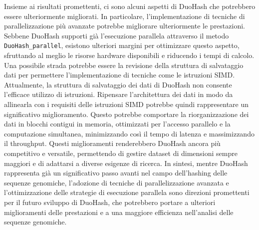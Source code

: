 Insieme ai risultati promettenti, ci sono alcuni aspetti di DuoHash che potrebbero essere ulteriormente migliorati. In particolare, l'implementazione di tecniche di parallelizzazione più avanzate potrebbe migliorare ulteriormente le prestazioni. Sebbene DuoHash supporti già l'esecuzione parallela attraverso il metodo \verb|DuoHash_parallel|, esistono ulteriori margini per ottimizzare questo aspetto, sfruttando al meglio le risorse hardware disponibili e riducendo i tempi di calcolo. Una possibile strada potrebbe essere la revisione della struttura di salvataggio dati per permettere l'implementazione di tecniche come le istruzioni \ac{SIMD}. Attualmente, la struttura di salvataggio dei dati di DuoHash non consente l'efficace utilizzo di istruzioni. Ripensare l'architettura dei dati in modo da allinearla con i requisiti delle istruzioni \acs{SIMD} potrebbe quindi rappresentare un significativo miglioramento. Questo potrebbe comportare la riorganizzazione dei dati in blocchi contigui in memoria, ottimizzati per l'accesso parallelo e la computazione simultanea, minimizzando così il tempo di latenza e massimizzando il throughput. Questi miglioramenti renderebbero DuoHash ancora più competitivo e versatile, permettendo di gestire dataset di dimensioni sempre maggiori e di adattarsi a diverse esigenze di ricerca. In sintesi, mentre DuoHash rappresenta già un significativo passo avanti nel campo dell'hashing delle sequenze genomiche, l'adozione di tecniche di parallelizzazione avanzata e l'ottimizzazione delle strategie di esecuzione parallela sono direzioni promettenti per il futuro sviluppo di DuoHash, che potrebbero portare a ulteriori miglioramenti delle prestazioni e a una maggiore efficienza nell'analisi delle sequenze genomiche.
